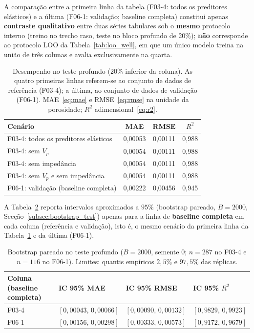 \documentclass[12pt,a4paper]{article}
\newcommand{\dadosref}{conjunto de dados de referência (F03-4)}
\newcommand{\dadosval}{conjunto de dados de validação (F06-1)}
\begin{document}
A comparação entre a primeira linha da tabela (F03-4: todos os preditores elásticos) e a
última (F06-1: validação; baseline completa) constitui apenas \textbf{contraste qualitativo} entre
duas séries tabulares sob o \textbf{mesmo} protocolo interno (treino no trecho raso,
teste no bloco profundo de 20\%); \textbf{não} corresponde ao protocolo LOO da
Tabela~\ref{tab:loo_well}, em que um único modelo treina na união de três colunas e
avalia exclusivamente na quarta.

\begin{table}[h]
\centering
\begin{tabular}{lccc}
\toprule
Cenário & MAE & RMSE & \(R^2\) \\
\midrule
F03-4: todos os preditores elásticos & 0{,}00053 & 0{,}00111 & 0{,}988 \\
F03-4: sem \(V_p\) & 0{,}00054 & 0{,}00111 & 0{,}988 \\
F03-4: sem impedância & 0{,}00054 & 0{,}00111 & 0{,}988 \\
F03-4: sem \(V_p\) e sem impedância & 0{,}00054 & 0{,}00111 & 0{,}988 \\
F06-1: validação (baseline completa) & 0{,}00222 & 0{,}00456 & 0{,}945 \\
\bottomrule
\end{tabular}
\caption{Desempenho no teste profundo (20\% inferior da coluna). As quatro primeiras linhas
referem-se ao \dadosref; a última, ao \dadosval. MAE~\eqref{eq:mae} e
RMSE~\eqref{eq:rmse} na unidade da porosidade; \(R^2\) adimensional~\eqref{eq:r2}.}
\label{tab:metricas}
\end{table}

A Tabela~\ref{tab:bootstrap_ic} reporta intervalos aproximados a \(95\%\) (bootstrap
pareado, \(B=2000\), Secção~\ref{subsec:bootstrap_test}) apenas para a linha de
\textbf{baseline completa} em cada coluna (referência e validação), isto é, o mesmo cenário da primeira
linha da Tabela~\ref{tab:metricas} e da última (F06-1).

\begin{table}[h]
\centering
\small
\begin{tabular}{lp{3.5cm}p{3.5cm}p{3.2cm}}
\toprule
Coluna (baseline completa) & IC 95\% MAE & IC 95\% RMSE & IC 95\% \(R^2\) \\
\midrule
F03-4 & $[0{,}00043,\,0{,}00066]$ & $[0{,}00090,\,0{,}00132]$ & $[0{,}9829,\,0{,}9923]$ \\
F06-1 & $[0{,}00156,\,0{,}00298]$ & $[0{,}00333,\,0{,}00573]$ & $[0{,}9172,\,0{,}9679]$ \\
\bottomrule
\end{tabular}
\caption{Bootstrap pareado no teste profundo (\(B=2000\), semente \(0\); \(n=287\) no
F03-4 e \(n=116\) no F06-1). Limites: quantis empíricos \(2{,}5\%\) e \(97{,}5\%\)
das réplicas.}
\label{tab:bootstrap_ic}
\end{table}
\end{document}
